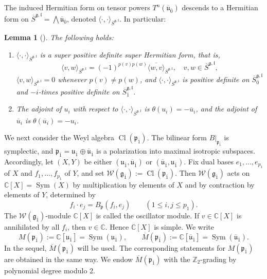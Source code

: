 \documentclass[11pt]{amsart}
\newcommand{\bracket}{{\langle \cdot,\cdot \rangle}}
\def\CC{{\mathbb C}}
\def\ubar{{\overline{\mathfrak{u}}}}
\def\spinbar{{\overline{S}^{\gg,\ll}}}
\def\spinbar{{\overline{S}^{\gg,\ll}}}
\def\Cl{{\operatorname{Cl}}}
\def\pp{{\mathfrak p}}
\def\uu{{\mathfrak u}}
\def\bra{{\langle}}
\def\ket{{\rangle}}
\def\ll{{\mathfrak l}}
\def\odd{{\mathfrak{g}_{\bar{1}}}}
\def\pp{{\mathfrak p}}
\def\pp{{\mathfrak{p}}}
\def\gg{{\mathfrak{g}}}
\def\ZZ{{\mathbb Z}}
\def\Weyl{{\mathscr{W}(\odd)}}
\newcommand{\Sym}{\operatorname{Sym}}
\theoremstyle{plain}
\newtheorem{lemma}[theorem]{Lemma}
\theoremstyle{remark}
\theoremstyle{definition}
\numberwithin{equation}{section}
\theoremstyle{remark}
\begin{document}
The induced Hermitian form on tensor powers $T^n(\ubar_{\bar 0})$ descends to a Hermitian form on
$\spinbar=\bigwedge \ubar_{\bar 0}$, denoted $\bracket_{\spinbar}$. In particular:

\begin{lemma}[{\cite[Lemma 3.2.3]{Schmidt_Noja}}]\label{lemm::adjoint_spin} The following holds:
\begin{enumerate}
\item[a)]  $\bracket_{\spinbar}$ is a super positive definite super Hermitian form, that is,
 \[
\bra v,w \ket_{\spinbar}=(-1)^{p(v)p(w)}\overline{\bra w,v\ket}_{\spinbar}, \quad v,w \in \spinbar, 
 \]
 $\bra v,w \ket_{\spinbar}=0$ whenever $p(v) \neq p(w)$, and $\bra\cdot,\cdot\ket_{\spinbar}$ is positive definite on $\overline{S}^{\gg,\ll}_{\bar{0}}$ and $-i$-times positive definite on $\overline{S}^{\gg,\ll}_{\bar{1}}$.
 \item[b)] The adjoint of $u_{i}$ with respect to $\langle \cdot,\cdot\rangle_{\spinbar}$ is $\theta(u_{i})=-\overline{u}_{i}$, and the adjoint of $\overline{u}_{i}$ is $\theta(\overline{u}_{i})=-u_{i}$.
\end{enumerate}
\end{lemma}

We next consider the Weyl algebra $\Cl(\pp_{\bar 1})$. The bilinear form $B|_{\pp_{\bar 1}}$ is symplectic, and $\pp_{\bar 1}=\uu_{\bar 1}\oplus \ubar_{\bar 1}$ is a polarization into maximal isotropic subspaces. Accordingly, let $(X,Y)$ be either $(\uu_{\bar 1},\ubar_{\bar 1})$ or $(\ubar_{\bar 1},\uu_{\bar 1})$. Fix dual bases $e_{1},\dots,e_{p_{1}}$ of $X$ and $f_{1},\dots,f_{p_{1}}$ of $Y$, and set $\Weyl:=\Cl(\pp_{\bar 1})$. Then $\Weyl$ acts on $\CC[X]=\Sym(X)$ by multiplication by elements of $X$ and by contraction by elements of $Y$, determined by
\begin{equation}
f_{i}\cdot e_{j}=B_{\pp}(f_{i},e_{j}) \qquad (1\leq i,j\leq p_{1}).
\end{equation}
The $\Weyl$-module $\CC[X]$ is called the oscillator module. If $v\in \CC[X]$ is annihilated by all $f_{i}$, then $v\in \CC$. Hence $\CC[X]$ is simple. We write
\begin{equation}
M(\pp_{\bar 1}):=\CC[\uu_{\bar 1}]=\Sym(\uu_{\bar 1}), \qquad \overline{M}(\pp_{\bar 1}):=\CC[\ubar_{\bar 1}]=\Sym(\ubar_{\bar 1}).
\end{equation}
In the sequel, $\overline{M}(\pp_{\bar 1})$ will be used. The corresponding statements for $M(\pp_{\bar 1})$ are obtained in the same way. We endow
$\overline M(\pp_{\bar 1})$ with the $\ZZ_2$-grading by polynomial degree modulo $2$.
\end{document}
